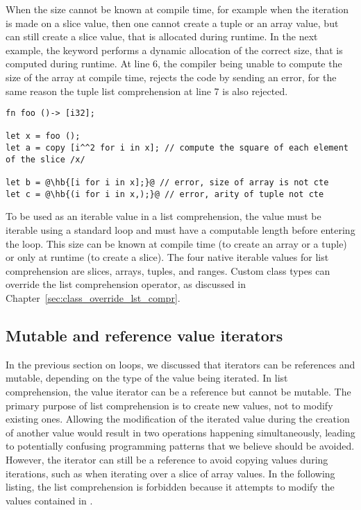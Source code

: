 When the size cannot be known at compile time, for example when the iteration is
made on a slice value, then one cannot create a tuple or an array value, but can
still create a slice value, that is allocated during runtime. In the next
example, the keyword  performs a dynamic allocation of the correct
size, that is computed during runtime. At line 6, the compiler being unable to
compute the size of the array at compile time, rejects the code by sending an
error, for the same reason the tuple list comprehension at line 7 is also
rejected.

\begin{lstlisting}[style=coloredverbatim, escapechar=@]
fn foo ()-> [i32];

let x = foo ();
let a = copy [i^^2 for i in x]; // compute the square of each element of the slice /x/

let b = @\hb{[i for i in x];}@ // error, size of array is not cte
let c = @\hb{(i for i in x,);}@ // error, arity of tuple not cte
\end{lstlisting}

To be used as an iterable value in a list comprehension, the value must be
iterable using a standard  loop and must have a computable length
before entering the loop. This size can be known at compile time (to create an
array or a tuple) or only at runtime (to create a slice). The four native
iterable values for list comprehension are slices, arrays, tuples, and ranges.
Custom class types can override the list comprehension operator, as discussed in
Chapter~\ref{sec:class_override_lst_compr}.

\subsection{Mutable and reference value iterators}

In the previous section on  loops, we discussed that iterators can be
references and mutable, depending on the type of the value being iterated. In
list comprehension, the value iterator can be a reference but cannot be mutable.
The primary purpose of list comprehension is to create new values, not to modify
existing ones. Allowing the modification of the iterated value during the
creation of another value would result in two operations happening
simultaneously, leading to potentially confusing programming patterns that we
believe should be avoided. However, the iterator can still be a reference to
avoid copying values during iterations, such as when iterating over a slice of
array values. In the following listing, the list comprehension is forbidden
because it attempts to modify the values contained in .

